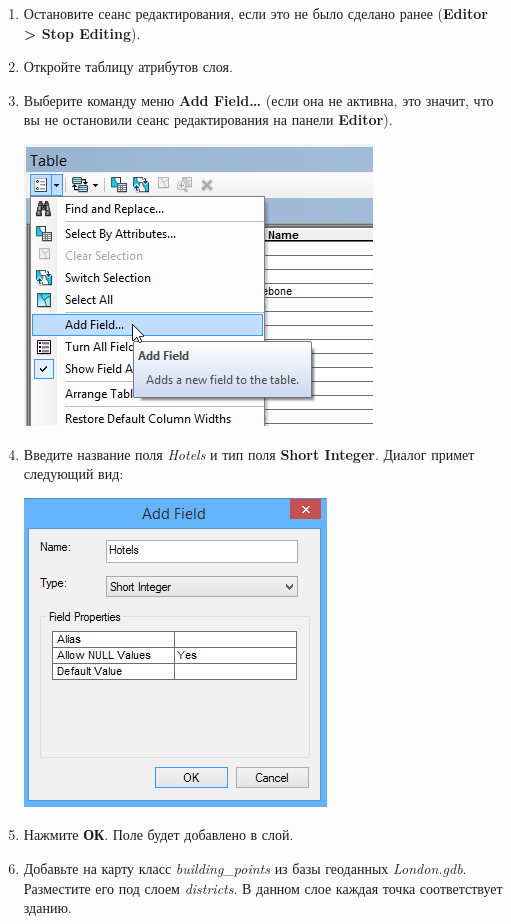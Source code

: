 \documentclass[]{book}
\theoremstyle{definition}
\theoremstyle{definition}
\theoremstyle{definition}
\theoremstyle{remark}
\begin{document}
\begin{enumerate}
\def\labelenumi{\arabic{enumi}.}
\item
  Остановите сеанс редактирования, если это не было сделано ранее
  (\textbf{Editor \textgreater{} Stop Editing}).
\item
  Откройте таблицу атрибутов слоя.
\item
  Выберите команду меню \textbf{Add Field\ldots{}} (если она не активна,
  это значит, что вы не остановили сеанс редактирования на панели
  \textbf{Editor}).

  \includegraphics{images/Ex07/image14.png}
\item
  Введите название поля \emph{Hotels} и тип поля \textbf{Short Integer}.
  Диалог примет следующий вид:

  \includegraphics{images/Ex07/image15.png}
\item
  Нажмите \textbf{ОК}. Поле будет добавлено в слой.
\item
  Добавьте на карту класс \emph{building\_points} из базы геоданных
  \emph{London.gdb}. Разместите его под слоем \emph{districts}. В данном
  слое каждая точка соответствует зданию.


\end{enumerate}
\end{document}
